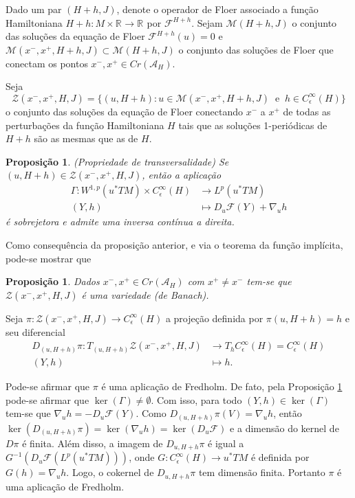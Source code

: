 \documentclass[12pt]{book}
\newtheorem{proposicao}[teorema]{Proposição}
\newcommand{\diferencialfloerponto}[1]{D_{#1}\operadorFloer}
\newcommand{\energiafinitaM}{\mathcal{M}}
\newcommand{\energiafinitaMHamiltoniana}[1]{\energiafinitaM(#1, J)}
\newcommand{\energiafinitaMconectanteHamiltoniana}{\energiafinitaM(x^{-}, x^{+},H+h,J)}
\newcommand{\espacoLp}[1]{L^{p}(#1)}
\newcommand{\espacosobolev}[1]{W^{1,p}(#1)}
\newcommand{\funcionalH}{\mathcal{A}_{H}}
\newcommand{\operadorFloer}{\mathcal{F}}
\newcommand{\orbitasConectantesZ}{\mathcal{Z}(x^{-}, x^{+},H, J)}
\newcommand{\perturbacaoHamiltoniana}[1]{C^{\infty}_{\epsilon}(#1)}
\newcommand{\pontoscriticos}[1]{\textit{Cr}(#1)}
\newcommand{\pullbackfibradotangente}[2]{#1^{*}T#2}
\newcommand{\pullbackfibradotangenteM}[1]{\pullbackfibradotangente{#1}{M}}
\newcommand{\real}[1]{\mathbb{R}^{#1}}
\newcommand{\reta}{\real{}}
\begin{document}
	Dado um par $(H+h, J)$, denote o operador de Floer associado a função Hamiltoniana $H+h:M\times \reta \to \reta$ por $\operadorFloer^{H+h}$. Sejam $\energiafinitaMHamiltoniana{H+h}$ o conjunto das soluções da equação de Floer $\operadorFloer^{H+h}(u)=0$ e  $\energiafinitaMconectanteHamiltoniana \subset \energiafinitaMHamiltoniana{H+h}$ o conjunto das soluções de Floer que conectam os pontos $x^{-}, x^{+} \in \pontoscriticos{\funcionalH}$.
	
	Seja 
	$$
	\orbitasConectantesZ = \{ (u, H+h): u \in  \energiafinitaMconectanteHamiltoniana \;\;\text{e}\;\; h\in \perturbacaoHamiltoniana{H} \}
	$$
	o conjunto das soluções da equação de Floer conectando $x^{-}$ a $x^{+}$ de todas as perturbações da função Hamiltoniana $H$ tais que as soluções 1-periódicas de $H+h$ são as mesmas que as de $H$.
	
	\begin{proposicao}\label{proposicao_gamma_sobrejetora}
		(Propriedade de transversalidade) Se $(u, H+h) \in \orbitasConectantesZ$, então a aplicação 
		$$
		\begin{aligned}
		\Gamma:\espacosobolev{\pullbackfibradotangenteM{u}}\times \perturbacaoHamiltoniana{H} 
		&\to \espacoLp{\pullbackfibradotangenteM{u}}
		\\
		(Y, h) 
		&\mapsto \diferencialfloerponto{u}(Y) + \nabla_{u}h
		\end{aligned}
		$$
		é sobrejetora e admite uma inversa contínua a direita.
	\end{proposicao}
	
	Como consequência da proposição anterior, e via o teorema da função implícita, pode-se mostrar que
	
	\begin{proposicao}\label{proposicao_orbitasConectantesZ}
		Dados $x^{-},x^{+}\in \pontoscriticos{\funcionalH}$ com $x^{+}\neq  x^{-}$ tem-se que $\orbitasConectantesZ$ é uma variedade (de Banach). 
	\end{proposicao}
	
	Seja $\pi:\orbitasConectantesZ \to \perturbacaoHamiltoniana{H}$ a projeção definida por $\pi(u, H+h) = h$ e seu diferencial
	$$
	\begin{aligned}
	D_{(u,H+h)}\pi: T_{(u,H+h)}\orbitasConectantesZ 
	&\to T_{h}\perturbacaoHamiltoniana{H}=\perturbacaoHamiltoniana{H}
	\\
	(Y,h) &\mapsto h.
	\end{aligned}
	$$
	
	Pode-se afirmar que $\pi$ é uma aplicação de Fredholm. De fato, pela Proposição \ref{proposicao_gamma_sobrejetora} pode-se afirmar que $\ker(\Gamma)\neq \emptyset$. Com isso, para todo $(Y,h)\in\ker(\Gamma)$ tem-se que $\nabla_{u}h =- \diferencialfloerponto{u}(Y)$. Como $D_{(u,H+h)}\pi(V) = \nabla_{u} h$, então $\ker(D_{(u,H+h)}\pi) = \ker(\nabla_{u} h) = \ker(\diferencialfloerponto{u})$ e a dimensão do kernel de $D\pi$ é finita. Além disso, a imagem de $D_{u, H+h}\pi$ é igual a $G^{-1}(\diferencialfloerponto{u}(\espacoLp{\pullbackfibradotangenteM{u}}))$, onde $G:\perturbacaoHamiltoniana{H} \to \pullbackfibradotangenteM{u}$ é definida por $G(h) = \nabla_{u}h$. Logo, o cokernel de $D_{u, H+h}\pi$ tem dimensão finita. Portanto $\pi$ é uma aplicação de Fredholm.
\end{document}
